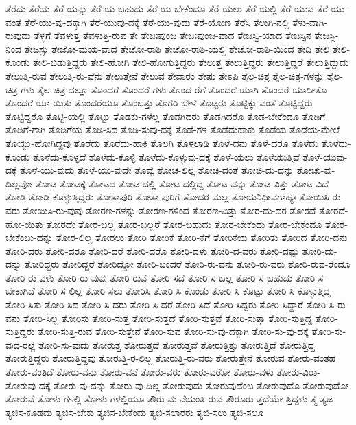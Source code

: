 {ತೆರೆದು
ತೆರೆಯ
ತೆರೆ-ಯನ್ನು
ತೆರೆ-ಯ-ಬಹುದು
ತೆರೆ-ಯ-ಬೇಕೆಂದೂ
ತೆರೆ-ಯಲು
ತೆರೆ-ಯಲ್ಲಿ
ತೆರೆ-ಯುವ
ತೆರೆ-ಯು-ವಂತೆ
ತೆರೆ-ಯು-ವು-ದಕ್ಕಾಗಿ
ತೆರೆ-ಯುವು-ದಕ್ಕೆ
ತೆರೆ-ಯು-ವುದು
ತೆರೆ-ಯೋಣ
ತೆರೆಸಿ
ತೆಲುಗಿ-ನಲ್ಲಿ
ತೆಳು-ವಾಗಿ-ರುವುದು
ತೆಳ್ಳಗೆ
ತೆವಳುತ್ತ
ತೆವಳುತ್ತಿ-ರುವ
ತೇ
ತೇಜಃಪುಂಜ
ತೇಜಃಪುಂಜ-ವಾದ
ತೇಜಸ್ವಿ-ಯಾದ
ತೇಜಸ್ಸಿನ
ತೇಜಸ್ಸಿ-ನಿಂದ
ತೇಜಸ್ಸು
ತೇಜೋ-ಮಯ-ವಾದ
ತೇಜೋ-ರಾಶಿ
ತೇಜೋ-ರಾಶಿ-ಯಲ್ಲಿ
ತೇಜೋ-ರಾಶಿ-ಯಿಂದ
ತೇದಿ
ತೇಲಿ
ತೇಲಿ-ಕೊಂಡು
ತೇಲಿ-ಬಿಡುತ್ತಿದ್ದರು
ತೇಲಿ-ಹೋಗಿ
ತೇಲಿ-ಹೋಗುತ್ತಿದ್ದರು
ತೇಲುತ್ತ
ತೇಲುತ್ತಿದ್ದರು
ತೇಲುತ್ತಿದ್ದರೆ
ತೇಲುತ್ತಿದ್ದುದು
ತೇಲುತ್ತಿ-ರುವ
ತೇಲುತ್ತಿ-ರು-ವೆನು
ತೇಲುತ್ತೇನೆ
ತೇಲುವ
ತೇವಾರಂ
ತೇಷು
ತೇಽಪಿ
ತೈಲ-ಚಿತ್ರ
ತೈಲ-ಚಿತ್ರ-ಗಳನ್ನು
ತೈಲ-ಚಿತ್ರ-ಗಳು
ತೈಲ-ಚಿತ್ರ-ದಲ್ಲೂ
ತೊಂದರೆ
ತೊಂದರೆ-ಗಳು
ತೊಂದ-ರೆಗೆ
ತೊಂದರೆ-ಯಾಗಿ
ತೊಂದರೆ-ಯಾದೀತೊ
ತೊಂದರೆ-ಯಾ-ಯಿತು
ತೊಂದರೆಯೂ
ತೊಂಬತ್ತು
ತೊಗರಿ-ಬೇಳೆ
ತೊಟ್ಟರು
ತೊಟ್ಟಿಕ್ಕು-ವಂತೆ
ತೊಟ್ಟಿದ್ದರು
ತೊಟ್ಟಿದ್ದರೊ
ತೊಟ್ಟಿ-ಯಲ್ಲಿ
ತೊಟ್ಟು
ತೊಡಕು-ಗಳೆಲ್ಲ
ತೊಡಗಿದರು
ತೊಡಗಿದರೊ
ತೊಡ-ಬೇಕೆಂದೂ
ತೊಡಿಗೆ
ತೊಡಿಗೆ-ಗಾಗಿ
ತೊಡಿಗೆಯ
ತೊಡಿ-ಸಿದ
ತೊಡಿ-ಸುವು-ದಕ್ಕೆ
ತೊಡೆ-ಗಳ
ತೊಡೆದುಹಾಕು
ತೊಡೆಯ
ತೊಡೆಯ-ಮೇಲೆ
ತೊಯ್ದು-ಹೋಗಿದ್ದವು
ತೊರೆದು
ತೊರೆದು-ಹಾಕಿ
ತೊಲಗಿ
ತೊಳಲಾಡಿ
ತೊಳೆ-ದನು
ತೊಳೆ-ದರೂ
ತೊಳೆದು
ತೊಳೆದು-ಕೊಂಡು
ತೊಳೆದು-ಕೊಳ್ಳದೆ
ತೊಳೆದು-ಕೊಳ್ಳಿ
ತೊಳೆದು-ಕೊಳ್ಳುವು-ದಕ್ಕೆ
ತೊಳೆ-ಯಲು
ತೊಳೆಯುತ್ತಿವೆ
ತೊಳೆ-ಯುವು-ದಕ್ಕೆ
ತೊಳೆ-ಯು-ವುದು
ತೊಳೆ-ಯು-ವುದೇ
ತೊವ್ವೆ
ತೋಚ-ಲಿಲ್ಲ
ತೋಚಿ-ದಂತೆ
ತೋಚಿ-ದು-ದನ್ನು
ತೋಚು-ವು-ದಿಲ್ಲವೋ
ತೋಟ
ತೋಟಕ್ಕೆ
ತೋಟದ
ತೋಟ-ದಲ್ಲಿ
ತೋಟ-ದಲ್ಲಿದ್ದ
ತೋಟ-ವನ್ನು
ತೋಟ-ವಿತ್ತು
ತೋಟ-ವಿದೆ
ತೋಡಿ
ತೋಡಿ-ಕೊಳ್ಳುತ್ತಿದ್ದರು
ತೋತಾಪುರಿ
ತೋತಾ-ಪುರಿಗೆ
ತೋದರ-ಮಲ್ಲ
ತೋಯನಿಧೀವಗಾಹ್ಯಃ
ತೋಯಿಸಿ-ರು-ವರು
ತೋಯಿಸಿ-ರು-ವುವು
ತೋರಣ-ಗಳನ್ನು
ತೋರಣ-ಗಳಿಂದ
ತೋರಣ-ವಿತ್ತು
ತೋರ-ದು-ದರ
ತೋರದೆ
ತೋರದೆ-ಹೋ-ಯಿತು
ತೋರದೇ
ತೋರ-ಬಲ್ಲ
ತೋರ-ಬಲ್ಲರೆ
ತೋರ-ಬಹುದು
ತೋರ-ಬೇಕೆಂದು
ತೋರ-ಬೇಕೆಂದೂ
ತೋರ-ಬೇಕೆಂಬು-ದನ್ನು
ತೋರ-ಲಿಲ್ಲ
ತೋರಲು
ತೋರಿ
ತೋರಿಕೆ
ತೋರಿ-ಕೆಗೆ
ತೋರಿಕೆಯ
ತೋರಿತು
ತೋರಿದ
ತೋರಿ-ದನು
ತೋರಿ-ದರು
ತೋರಿ-ದರೂ
ತೋರಿ-ದರೆ
ತೋರಿ-ದರೊ
ತೋರಿ-ದಳು
ತೋರಿ-ದ-ವರು
ತೋರಿ-ದಷ್ಟು
ತೋರಿ-ದು-ದನ್ನು
ತೋರಿದ್ದರು
ತೋರಿದ್ದರೆ
ತೋರಿದ್ದೋ
ತೋರಿ-ಬಂದರೆ
ತೋರಿ-ರು-ವನು
ತೋರಿ-ರು-ವರು
ತೋರಿ-ರುವ-ರೆಂದೂ
ತೋರಿ-ರು-ವಳು
ತೋರಿ-ರು-ವುವು
ತೋರಿ-ರುವೆ
ತೋರಿ-ಸದೆ
ತೋರಿ-ಸ-ಬಲ್ಲ
ತೋರಿ-ಸ-ಬಹುದು
ತೋರಿ-ಸ-ಬೇಕಾಗಿದೆ
ತೋರಿ-ಸ-ಲಿಲ್ಲ
ತೋರಿ-ಸಲು
ತೋರಿಸಿ
ತೋರಿ-ಸಿ-ಕೊಂಡು
ತೋರಿ-ಸಿ-ಕೊಟ್ಟು
ತೋರಿ-ಸಿ-ಕೊಳ್ಳುತ್ತಿದ್ದ
ತೋರಿ-ಸಿತು
ತೋರಿ-ಸಿದ
ತೋರಿ-ಸಿ-ದರು
ತೋರಿ-ಸಿ-ದರೆ
ತೋರಿ-ಸಿದೆ
ತೋರಿ-ಸಿದ್ದರು
ತೋರಿ-ಸಿದ್ದಾರೆ
ತೋರಿ-ಸಿ-ರು-ವನು
ತೋರಿ-ಸಿಲ್ಲ
ತೋರಿಸು
ತೋರಿ-ಸುತ್ತ
ತೋರಿ-ಸುತ್ತದೆ
ತೋರಿ-ಸುತ್ತವೆ
ತೋರಿ-ಸುತ್ತಾ
ತೋರಿ-ಸುತ್ತಿದ್ದ
ತೋರಿ-ಸುತ್ತಿದ್ದರು
ತೋರಿ-ಸುತ್ತಿ-ರುವ
ತೋರಿ-ಸುತ್ತೇನೆ
ತೋರಿ-ಸುವ
ತೋರಿ-ಸು-ವು-ದಕ್ಕಾಗಿ
ತೋರಿ-ಸು-ವು-ದಕ್ಕೆ
ತೋರಿ-ಸು-ವುದ-ರಲ್ಲೆ
ತೋರಿ-ಸು-ವುದು
ತೋರುತ್ತ
ತೋರುತ್ತದೆ
ತೋರುತ್ತವೆ
ತೋರುತ್ತಿತ್ತು
ತೋರುತ್ತಿದೆ
ತೋರುತ್ತಿದ್ದ
ತೋರುತ್ತಿದ್ದರು
ತೋರುತ್ತಿದ್ದವು
ತೋರುತ್ತಿ-ರ-ಲಿಲ್ಲ
ತೋರುತ್ತಿ-ರು-ವರು
ತೋರುತ್ತೇನೆ
ತೋರುವ
ತೋರು-ವಂತಹ
ತೋರು-ವಂತಿದೆ
ತೋರು-ವನು
ತೋರು-ವನೆ
ತೋರು-ವರು
ತೋರು-ವರೋ
ತೋರು-ವಳು
ತೋರು-ವಿರಾ-
ತೋರುವು-ದಕ್ಕೆ
ತೋರು-ವು-ದನ್ನು
ತೋರು-ವು-ದಿಲ್ಲ
ತೋರುವುದು
ತೋರುವುದೆಂಬ
ತೋರುವುದೊ
ತೋರುವುದೋ
ತೋರುವೆ
ತೋಳು-ಗಳಲ್ಲಿ
ತೋಳು-ಗಳಲ್ಲಿಯೂ
ತೌರು-ಮ-ನೆಯಂತಿ-ರುವ
ತೌರೂರು
ತ್ತದೆಯೇ
ತ್ತಿದ್ದಳು
ತ್ಮ
ತ್ಯಜ
ತ್ಯಜಿಸ-ಕೂಡದು
ತ್ಯಜಿಸ-ಬೇಕು
ತ್ಯಜಿಸ-ಬೇಕೆಂದು
ತ್ಯಜಿ-ಸಲಾರರು
ತ್ಯಜಿ-ಸಲು
ತ್ಯಜಿ-ಸಲೂ
}
